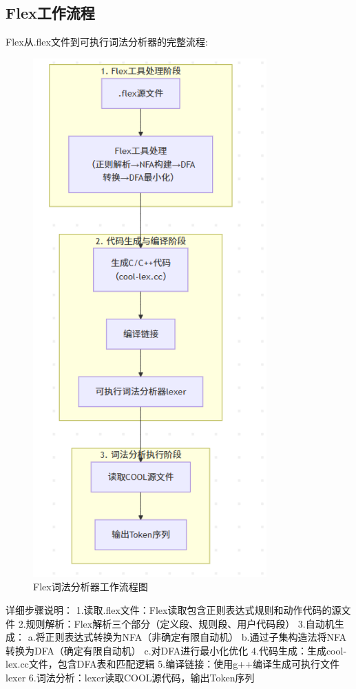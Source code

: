 \documentclass[twocolumn]{article}
\begin{document}
\subsection{Flex工作流程}
Flex从.flex文件到可执行词法分析器的完整流程:
\begin{figure}[htbp]
    \centering
    \includegraphics[width=0.8\textwidth]{Flex_work.png}
    \caption{Flex词法分析器工作流程图}
    \label{fig:flex_workflow}
\end{figure}
详细步骤说明：
1.读取.flex文件：Flex读取包含正则表达式规则和动作代码的源文件
2.规则解析：Flex解析三个部分（定义段、规则段、用户代码段）
3.自动机生成：
    a.将正则表达式转换为NFA（非确定有限自动机）
    b.通过子集构造法将NFA转换为DFA（确定有限自动机）
    c.对DFA进行最小化优化
4.代码生成：生成cool-lex.cc文件，包含DFA表和匹配逻辑
5.编译链接：使用g++编译生成可执行文件lexer
6.词法分析：lexer读取COOL源代码，输出Token序列
\end{document}
